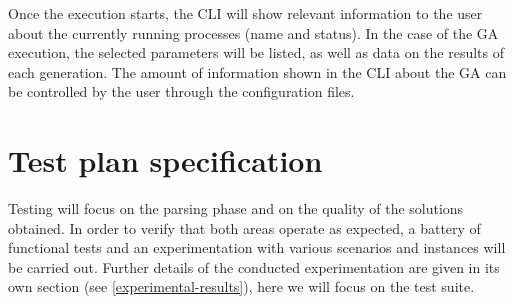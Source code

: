 Once the execution starts, the CLI will show relevant information to the user about the currently running processes (name and status). In the case of the GA execution, the selected parameters will be listed, as well as data on the results of each generation. The amount of information shown in the CLI about the GA can be controlled by the user through the configuration files. 



\section{Test plan specification}

Testing will focus on the parsing phase and on the quality of the solutions obtained. In order to verify that both areas operate as expected, a battery of functional tests and an experimentation with various scenarios and instances will be carried out. Further details of the conducted experimentation are given in its own section (see \ref{experimental-results}), here we will focus on the test suite.


